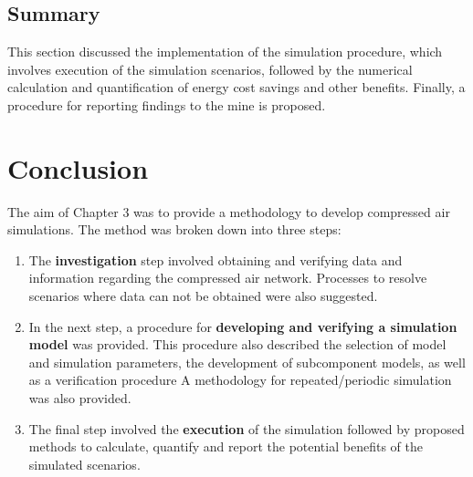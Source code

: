 	\subsection{Summary}
	This section discussed the implementation of the simulation procedure, which involves execution of the simulation scenarios, followed by the numerical calculation and quantification of energy cost savings and other benefits. Finally, a procedure for reporting findings to the mine is proposed.
\section{Conclusion}
The aim of Chapter 3 was to provide a methodology to develop compressed air simulations. The method was broken down into three steps:
\begin{enumerate}
	\item The \textbf{investigation} step involved obtaining and verifying data and information regarding the compressed air network. Processes to resolve scenarios where data can not be obtained were also suggested.
	\item In the next step, a procedure for \textbf{developing and verifying a simulation model} was provided. This procedure also described the selection of model and simulation parameters, the development of subcomponent models, as well as a verification procedure A methodology for repeated/periodic simulation was also provided.
	\item The final step involved the \textbf{execution} of the simulation followed by proposed methods to calculate, quantify and report the potential benefits of the simulated scenarios.
\end{enumerate}
